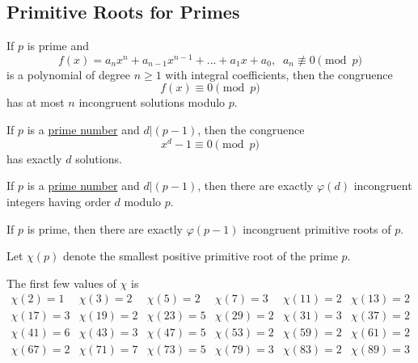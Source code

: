 \documentclass{article}
\newcounter{theorem}[section]
\newcounter{definition}[section]
\begin{document}
\subsection{Primitive Roots for Primes}

\begin{theorem}[Lagrange]
  \label{thm:lagrange}
If $p$ is prime and 
\begin{equation}
  f(x) = a_n x^n + a_{n-1} x^{n-1} + ... + a_1 x + a_0, \;\; a_n \not\equiv 0 \pmod{p}
\end{equation}
is a polynomial of degree $n\geq 1$ with integral coefficients, then the congruence 
\begin{equation}
  f(x) \equiv 0 \pmod{p}
\end{equation}
has at most $n$ incongruent solutions modulo $p$.
\end{theorem}

\begin{corollary}
  \label{thm:number-of-solutions-of-xdequiv1pmodp}
If $p$ is a \hyperref[def:prime-number]{prime number} and $d|(p-1)$, then the congruence 
\begin{equation}
  x^d - 1 \equiv 0 \pmod{p}
\end{equation}
has exactly $d$ solutions. 
\end{corollary}

\begin{theorem}
  \label{thm:count-of-integers-of-given-order-modulo-a-prime}
If $p$ is a \hyperref[def:prime-number]{prime number} and $d|(p-1)$, then there are exactly $\varphi(d)$ incongruent integers having order $d$ modulo $p$. 
\end{theorem}

\begin{corollary}
  \label{thm:number-of-primitive-roots-of-a-prime}
If $p$ is prime, then there are exactly $\varphi(p-1)$ incongruent primitive roots of $p$.
\end{corollary}

\begin{definition}
  \label{def:least-primitive-root-of-a-prime}
Let $\chi(p)$ denote the smallest positive primitive root of the prime $p$. 
\end{definition}

The first few values of $\chi$ is 
\begin{equation}
  \begin{array}{cccccc}
      \chi(2) = 1 & \chi(3) = 2 & \chi(5) = 2 & \chi(7) = 3 & \chi(11) = 2 & \chi(13) = 2 \\
      \chi(17) = 3 & \chi(19) = 2 & \chi(23) = 5 & \chi(29) = 2 & \chi(31) = 3 & \chi(37) = 2 \\
      \chi(41) = 6 & \chi(43) = 3 & \chi(47) = 5 & \chi(53) = 2 & \chi(59) = 2 & \chi(61) = 2 \\
      \chi(67) = 2 & \chi(71) = 7 & \chi(73) = 5 & \chi(79) = 3 & \chi(83) = 2 & \chi(89) = 3 \\
  \end{array}
\end{equation}
\end{document}
